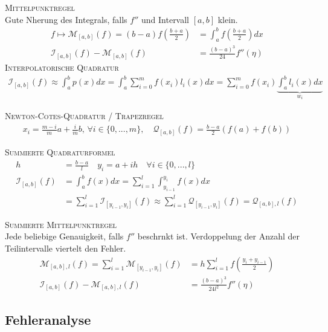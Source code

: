 \textsc{Mittelpunktregel}\\
Gute N\a herung des Integrals, falls $f''$ und Intervall $[a,b]$ klein.
\begin{align*}
f \mapsto \mathcal{M}_{[a,b]}(f) = (b-a)f\left(\frac{b+a}{2}\right) &= \int_a^b f\left(\frac{b+a}{2}\right) dx\\
\mathcal{I}_{[a,b]}(f)-\mathcal{M}_{[a,b]}(f) &= \frac{(b-a)^3}{24}f''(\eta)
\end{align*}
\textsc{Interpolatorische Quadratur}\\
\begin{align*}
\mathcal{I}_{[a,b]}(f) \approx \int_a^b p(x) dx = \int_a^b \sum_{i=0}^m f(x_i)l_i(x)dx=\sum_{i=0}^m f(x_i) \underbrace{\int_a^b l_i(x)dx}_{w_i}
\end{align*}\vspace{0.2cm}

\textsc{Newton-Cotes-Quadratur / Trapezregel}\\
\begin{align*}
x_i = \frac{m-i}{m}a + \frac{i}{m}b, \, \forall i\in \{0,...,m\}, \quad \mathcal{Q}_{[a,b]}(f)=\frac{b-a}{2}(f(a)+f(b))
\end{align*}

\textsc{Summierte Quadraturformel}\\
\begin{align*}
h&=\frac{b-a}{l} \quad y_i = a+ih \quad \forall i\in \{0,...,l\}\\
\mathcal{I}_{[a,b]}(f)&=\int_a^b f(x)dx = \sum_{i=1}^l\int_{y_{i-1}}^{y_i} f(x)dx\\ &= \sum_{i=1}^l \mathcal{I}_{[y_{i-1},y_i]}(f) \approx \sum_{i=1}^l \mathcal{Q}_{[y_{i-1},y_i]}(f) = \mathcal{Q}_{[a,b],l}(f)
\end{align*}

\textsc{Summierte Mittelpunktregel}\\
Jede beliebige Genauigkeit, falls $f''$ beschr\a nkt ist. Verdoppelung der Anzahl der Teilintervalle viertelt den Fehler.
\begin{align*}
\mathcal{M}_{[a,b],l}(f) = \sum_{i=1}^l \mathcal{M}_{[y_{i-1},y_i]}(f) &= h \sum_{i=1}^l f \left(\frac{y_i+y_{i-1}}{2}\right)\\
\mathcal{I}_{[a,b]}(f)-\mathcal{M}_{[a,b],l}(f) &= \frac{(b-a)^3}{24l^2}f''(\eta)
\end{align*}

\subsection{Fehleranalyse}
\clearpage










